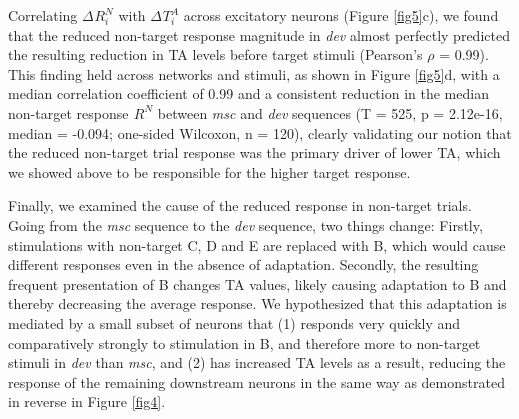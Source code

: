 \documentclass[pdflatex,referee,iicol,sn-basic]{sn-jnl}
\newcommand{\dev}{\textit{dev}}
\newcommand{\msc}{\textit{msc}}
\renewcommand{\R}[3][]{{}^{#1}_{}\!R^{#2}_{#3}}
\renewcommand{\T}[3][]{{}^{#1}_{}T^{#2}_{#3}}
\theoremstyle{thmstyleone}%
\theoremstyle{thmstyletwo}%
\theoremstyle{thmstylethree}%
\begin{document}
Correlating $\Delta \R{N}{i}$ with $\Delta \T{A}{i}$ across excitatory neurons (Figure \ref{fig5}c), we found that the reduced non-target response magnitude in \dev{} almost perfectly predicted the resulting reduction in TA levels before target stimuli (Pearson's $\rho$ = 0.99).
This finding held across networks and stimuli, as shown in Figure \ref{fig5}d, with a median correlation coefficient of 0.99 and a consistent reduction in the median non-target response $\R{N}{}$ between \msc{} and \dev{} sequences (T = 525, p = 2.12e-16, median = -0.094; one-sided Wilcoxon, n = 120), clearly validating our notion that the reduced non-target trial response was the primary driver of lower TA, which we showed above to be responsible for the higher target response.

Finally, we examined the cause of the reduced response in non-target trials. Going from the \msc{} sequence to the \dev{} sequence, two things change: Firstly, stimulations with non-target C, D and E are replaced with B, which would cause different responses even in the absence of adaptation. Secondly, the resulting  frequent presentation of B changes TA values, likely causing adaptation to B and thereby decreasing the average response. We hypothesized that this adaptation is mediated by a small subset of neurons that (1) responds very quickly and comparatively strongly to stimulation in B, and therefore more to non-target stimuli in \dev{} than \msc{}, and (2) has increased TA levels as a result, reducing the response of the remaining downstream neurons in the same way as demonstrated in reverse in Figure \ref{fig4}.
\end{document}

